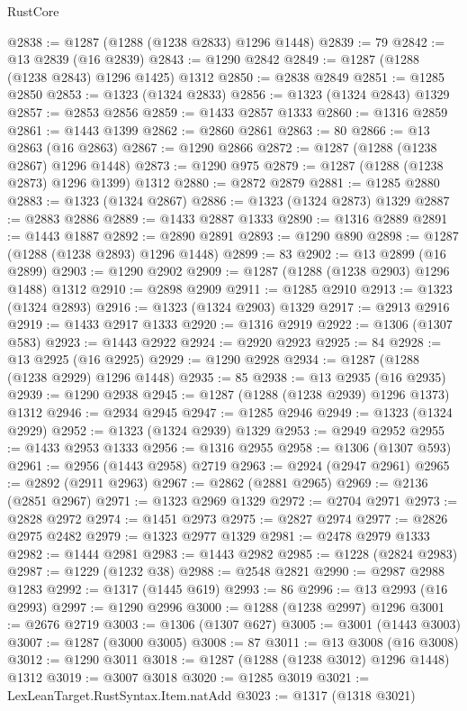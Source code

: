\begin{lexlean}{RustCore}
\begin{coremodule}
@2838 := @1287 (@1288 (@1238 @2833) @1296 @1448)
@2839 := 79
@2842 := @13 @2839 (@16 @2839)
@2843 := @1290 @2842
@2849 := @1287 (@1288 (@1238 @2843) @1296 @1425) @1312
@2850 := @2838 @2849
@2851 := @1285 @2850
@2853 := @1323 (@1324 @2833)
@2856 := @1323 (@1324 @2843) @1329
@2857 := @2853 @2856
@2859 := @1433 @2857 @1333
@2860 := @1316 @2859
@2861 := @1443 @1399
@2862 := @2860 @2861
@2863 := 80
@2866 := @13 @2863 (@16 @2863)
@2867 := @1290 @2866
@2872 := @1287 (@1288 (@1238 @2867) @1296 @1448)
@2873 := @1290 @975
@2879 := @1287 (@1288 (@1238 @2873) @1296 @1399) @1312
@2880 := @2872 @2879
@2881 := @1285 @2880
@2883 := @1323 (@1324 @2867)
@2886 := @1323 (@1324 @2873) @1329
@2887 := @2883 @2886
@2889 := @1433 @2887 @1333
@2890 := @1316 @2889
@2891 := @1443 @1887
@2892 := @2890 @2891
@2893 := @1290 @890
@2898 := @1287 (@1288 (@1238 @2893) @1296 @1448)
@2899 := 83
@2902 := @13 @2899 (@16 @2899)
@2903 := @1290 @2902
@2909 := @1287 (@1288 (@1238 @2903) @1296 @1488) @1312
@2910 := @2898 @2909
@2911 := @1285 @2910
@2913 := @1323 (@1324 @2893)
@2916 := @1323 (@1324 @2903) @1329
@2917 := @2913 @2916
@2919 := @1433 @2917 @1333
@2920 := @1316 @2919
@2922 := @1306 (@1307 @583)
@2923 := @1443 @2922
@2924 := @2920 @2923
@2925 := 84
@2928 := @13 @2925 (@16 @2925)
@2929 := @1290 @2928
@2934 := @1287 (@1288 (@1238 @2929) @1296 @1448)
@2935 := 85
@2938 := @13 @2935 (@16 @2935)
@2939 := @1290 @2938
@2945 := @1287 (@1288 (@1238 @2939) @1296 @1373) @1312
@2946 := @2934 @2945
@2947 := @1285 @2946
@2949 := @1323 (@1324 @2929)
@2952 := @1323 (@1324 @2939) @1329
@2953 := @2949 @2952
@2955 := @1433 @2953 @1333
@2956 := @1316 @2955
@2958 := @1306 (@1307 @593)
@2961 := @2956 (@1443 @2958) @2719
@2963 := @2924 (@2947 @2961)
@2965 := @2892 (@2911 @2963)
@2967 := @2862 (@2881 @2965)
@2969 := @2136 (@2851 @2967)
@2971 := @1323 @2969 @1329
@2972 := @2704 @2971
@2973 := @2828 @2972
@2974 := @1451 @2973
@2975 := @2827 @2974
@2977 := @2826 @2975 @2482
@2979 := @1323 @2977 @1329
@2981 := @2478 @2979 @1333
@2982 := @1444 @2981
@2983 := @1443 @2982
@2985 := @1228 (@2824 @2983)
@2987 := @1229 (@1232 @38)
@2988 := @2548 @2821
@2990 := @2987 @2988 @1283
@2992 := @1317 (@1445 @619)
@2993 := 86
@2996 := @13 @2993 (@16 @2993)
@2997 := @1290 @2996
@3000 := @1288 (@1238 @2997) @1296
@3001 := @2676 @2719
@3003 := @1306 (@1307 @627)
@3005 := @3001 (@1443 @3003)
@3007 := @1287 (@3000 @3005)
@3008 := 87
@3011 := @13 @3008 (@16 @3008)
@3012 := @1290 @3011
@3018 := @1287 (@1288 (@1238 @3012) @1296 @1448) @1312
@3019 := @3007 @3018
@3020 := @1285 @3019
@3021 := LexLeanTarget.RustSyntax.Item.natAdd
@3023 := @1317 (@1318 @3021)

\end{coremodule}
\end{lexlean}

